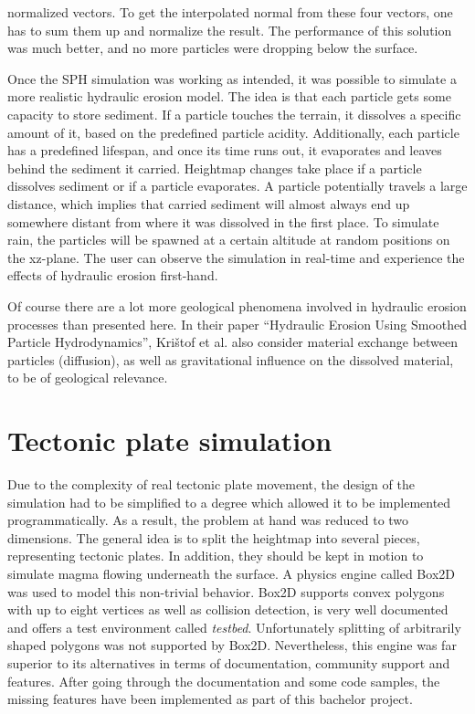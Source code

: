 \documentclass[11pt,a4paper,twoside,openright]{report}
\begin{document}
normalized vectors. To get the interpolated normal from these four vectors, one has to sum them up and normalize the result. The performance of this solution was much better, and no more particles were dropping below the surface.

Once the SPH simulation was working as intended, it was possible to simulate a more realistic hydraulic erosion model. The idea is that each particle gets some capacity to store sediment. If a particle touches the terrain, it dissolves a specific amount of it, based on the predefined particle acidity. Additionally, each particle has a predefined lifespan, and once its time runs out, it evaporates and leaves behind the sediment it carried. Heightmap changes take place if a particle dissolves sediment or if a particle evaporates. A particle potentially travels a large distance, which implies that carried sediment will almost always end up somewhere distant from where it was dissolved in the first place. To simulate rain, the particles will be spawned at a certain altitude at random positions on the xz-plane. The user can observe the simulation in real-time and experience the effects of hydraulic erosion first-hand.

Of course there are a lot more geological phenomena involved in hydraulic erosion processes than presented here. In their paper ``Hydraulic Erosion Using Smoothed Particle Hydrodynamics'', Kri\v{s}tof et al. also consider material exchange between particles (diffusion), as well as gravitational influence on the dissolved material, to be of geological relevance.

\section{Tectonic plate simulation}
\label{sec:tectonicplatesimulation}
Due to the complexity of real tectonic plate movement, the design of the simulation had to be simplified to a degree which allowed it to be implemented programmatically. As a result, the problem at hand was reduced to two dimensions. The general idea is to split the heightmap into several pieces, representing tectonic plates. In addition, they should be kept in motion to simulate magma flowing underneath the surface. A physics engine called Box2D was used to model this non-trivial behavior. Box2D supports convex polygons with up to eight vertices as well as collision detection, is very well documented and offers a test environment called \emph{testbed}. Unfortunately splitting of arbitrarily shaped polygons was not supported by Box2D. Nevertheless, this engine was far superior to its alternatives in terms of documentation, community support and features. After going through the documentation and some code samples, the missing features have been implemented as part of this bachelor project.
\end{document}

